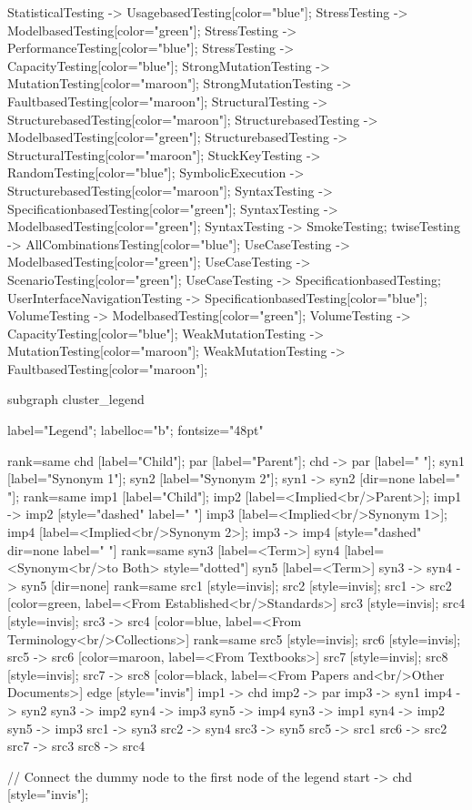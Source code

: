 \documentclass{article}
\begin{document}
{StatisticalTesting -> UsagebasedTesting[color="blue"];
StressTesting -> ModelbasedTesting[color="green"];
StressTesting -> PerformanceTesting[color="blue"];
StressTesting -> CapacityTesting[color="blue"];
StrongMutationTesting -> MutationTesting[color="maroon"];
StrongMutationTesting -> FaultbasedTesting[color="maroon"];
StructuralTesting -> StructurebasedTesting[color="maroon"];
StructurebasedTesting -> ModelbasedTesting[color="green"];
StructurebasedTesting -> StructuralTesting[color="maroon"];
StuckKeyTesting -> RandomTesting[color="blue"];
SymbolicExecution -> StructurebasedTesting[color="maroon"];
SyntaxTesting -> SpecificationbasedTesting[color="green"];
SyntaxTesting -> ModelbasedTesting[color="green"];
SyntaxTesting -> SmokeTesting;
twiseTesting -> AllCombinationsTesting[color="blue"];
UseCaseTesting -> ModelbasedTesting[color="green"];
UseCaseTesting -> ScenarioTesting[color="green"];
UseCaseTesting -> SpecificationbasedTesting;
UserInterfaceNavigationTesting -> SpecificationbasedTesting[color="blue"];
VolumeTesting -> ModelbasedTesting[color="green"];
VolumeTesting -> CapacityTesting[color="blue"];
WeakMutationTesting -> MutationTesting[color="maroon"];
WeakMutationTesting -> FaultbasedTesting[color="maroon"];

subgraph cluster_legend {

    label="Legend";
    labelloc="b";
    fontsize="48pt"

    {
        rank=same
        chd [label="Child"];
        par [label="Parent"];
        chd -> par [label="                "];
        syn1 [label="Synonym 1"];
        syn2 [label="Synonym 2"];
        syn1 -> syn2 [dir=none label="                "];
    }
    {
        rank=same
        imp1 [label="Child"];
        imp2 [label=<Implied<br/>Parent>];
        imp1 -> imp2 [style="dashed" label="                "]
        imp3 [label=<Implied<br/>Synonym 1>];
        imp4 [label=<Implied<br/>Synonym 2>];
        imp3 -> imp4 [style="dashed" dir=none label="                "]
    }
    {
        rank=same
        syn3 [label=<Term>]
        syn4 [label=<Synonym<br/>to Both> style="dotted"]
        syn5 [label=<Term>]
        syn3 -> syn4 -> syn5 [dir=none]
    }
{
rank=same
src1 [style=invis];
src2 [style=invis];
src1 -> src2 [color=green, label=<From Established<br/>Standards>]
src3 [style=invis];
src4 [style=invis];
src3 -> src4 [color=blue, label=<From Terminology<br/>Collections>]
}
{
rank=same
src5 [style=invis];
src6 [style=invis];
src5 -> src6 [color=maroon, label=<From Textbooks>]
src7 [style=invis];
src8 [style=invis];
src7 -> src8 [color=black, label=<From Papers and<br/>Other Documents>]
}
edge [style="invis"]
imp1 -> chd
imp2 -> par
imp3 -> syn1
imp4 -> syn2
syn3 -> imp2
syn4 -> imp3
syn5 -> imp4
syn3 -> imp1
syn4 -> imp2
syn5 -> imp3
src1 -> syn3
src2 -> syn4
src3 -> syn5
src5 -> src1
src6 -> src2
src7 -> src3
src8 -> src4
}

// Connect the dummy node to the first node of the legend
start -> chd [style="invis"];
}
\end{document}
